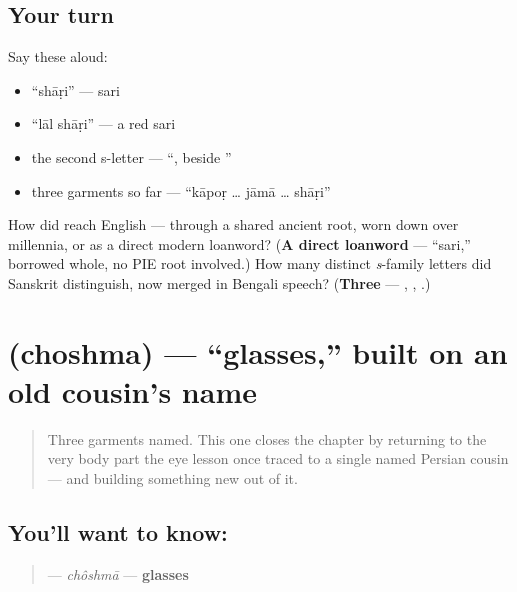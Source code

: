 \subsection*{Your turn}
Say these aloud:

\begin{itemize}
\raggedright
  \item \textquotedblleft{}shāṛi\textquotedblright{} — sari
  \item \textquotedblleft{}lāl shāṛi\textquotedblright{} — a red sari
  \item the second s-letter — \textquotedblleft{}, beside \textquotedblright{}
  \item three garments so far — \textquotedblleft{}kāpoṛ … jāmā … shāṛi\textquotedblright{}
\end{itemize}

\begin{tcolorbox}[breakable,colback=teal!4,colframe=teal!35!black,title={Before you move on}]
How did  reach English — through a shared ancient root, worn down over millennia, or as a direct modern loanword? (\textbf{A direct loanword} — \textquotedblleft{}sari,\textquotedblright{} borrowed whole, no PIE root involved.) How many distinct \emph{s}-family letters did Sanskrit distinguish, now merged in Bengali speech? (\textbf{Three} — , , .)
\end{tcolorbox}
\section[choshma]{ (choshma) — \textquotedblleft{}glasses,\textquotedblright{} built on an old cousin's name}

\label{lesson:BN-C15-choshma}



\begin{quote}
Three garments named. This one closes the chapter by returning to the very body part the eye lesson once traced to a single named Persian cousin — and building something new out of it.
\end{quote}

\subsection*{You'll want to know: }
\begin{quote}
\textbf{} — \emph{chôshmā} — \textbf{glasses}
\end{quote}

